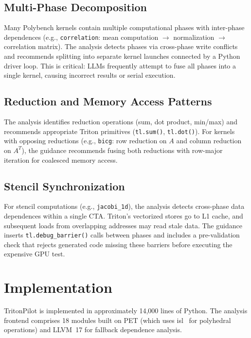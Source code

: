 \documentclass[sigconf]{acmart}
\newcommand{\sysname}{TritonPilot\xspace}
\newcommand{\pet}{PET\xspace}
\begin{document}
\subsection{Multi-Phase Decomposition}

Many Polybench kernels contain multiple computational phases with
inter-phase dependences (e.g., \texttt{correlation}: mean computation
$\to$ normalization $\to$ correlation matrix).  The analysis detects
phases via cross-phase write conflicts and recommends splitting into
separate kernel launches connected by a Python driver loop.  This is
critical: LLMs frequently attempt to fuse all phases into a single
kernel, causing incorrect results or serial execution.

\subsection{Reduction and Memory Access Patterns}

The analysis identifies reduction operations (sum, dot product, min/max)
and recommends appropriate Triton primitives (\texttt{tl.sum()},
\texttt{tl.dot()}).  For kernels with opposing reductions (e.g.,
\texttt{bicg}: row reduction on $A$ and column reduction on $A^T$), the
guidance recommends fusing both reductions with row-major iteration for
coalesced memory access.

\subsection{Stencil Synchronization}

For stencil computations (e.g., \texttt{jacobi\_1d}), the analysis
detects cross-phase data dependences within a single CTA.  Triton's
vectorized stores go to L1 cache, and subsequent loads from overlapping
addresses may read stale data.  The guidance inserts
\texttt{tl.debug\_barrier()} calls between phases and includes a
pre-validation check that rejects generated code missing these barriers
before executing the expensive GPU test.


\section{Implementation}
\label{sec:pipeline}

\sysname is implemented in approximately 14,000 lines of Python.  The
analysis frontend comprises 18 modules built on \pet{} (which uses
isl~\cite{verdoolaege2010isl} for polyhedral operations) and LLVM~17
for fallback dependence analysis.
\end{document}

